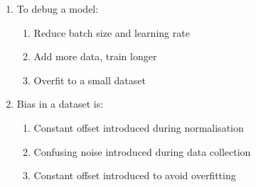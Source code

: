 \documentclass{report}
\numberwithin{equation}{section}
\begin{document}
\begin{enumerate}
\begin{enumerate}[label=\alph*.]
    \end{enumerate}
    \item To debug a model:
    \begin{enumerate}[label=\alph*.]
        \item Reduce batch size and learning rate
        \item Add more data, train longer
        \item Overfit to a small dataset
    \end{enumerate}
    \item Bias in a dataset is:
    \begin{enumerate}[label=\alph*.]
        \item Constant offset introduced during normalisation
        \item Confusing noise introduced during data collection
        \item Constant offset introduced to avoid overfitting
    \end{enumerate}
\end{enumerate}

\setcounter{section}{3}
\renewcommand{\thesection}{\arabic{section}}
\end{document}
